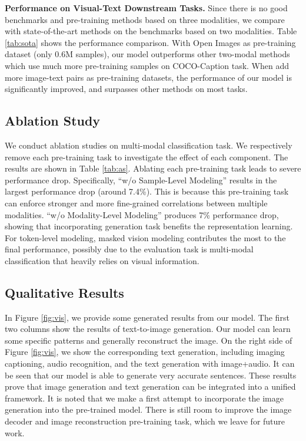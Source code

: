 \documentclass[10pt,twocolumn,letterpaper]{article}
\begin{document}
\textbf{Performance on Visual-Text Downstream Tasks.} Since there is no good benchmarks and pre-training methods based on three modalities, we compare with state-of-the-art methods on the benchmarks based on two modalities. Table \ref{tab:sota} shows the performance comparison. With Open Images as pre-training dataset (only 0.6M samples), our model outperforms other two-modal methods which use much more pre-training samples on COCO-Caption task. When add more image-text pairs as pre-training datasets, the performance of our model is significantly improved, and surpasses other methods on most tasks. 

\subsection{Ablation Study}
We conduct ablation studies on multi-modal classification task. We respectively remove each pre-training task to investigate the effect of each component. The results are shown in Table \ref{tab:as}. Ablating each pre-training task leads to severe performance drop. Specifically, ``w/o Sample-Level Modeling'' results in the largest performance drop (around 7.4\%). This is because this pre-training task can enforce stronger and more fine-grained correlations between multiple modalities. ``w/o Modality-Level Modeling'' produces 7\% performance drop, showing that incorporating generation task benefits the representation learning. For token-level modeling, masked vision modeling contributes the most to the final performance, possibly due to the evaluation task is multi-modal classification that heavily relies on visual information. 

\subsection{Qualitative Results}
In Figure \ref{fig:vis}, we provide some generated results from our model. The first two columns show the results of text-to-image generation. Our model can learn some specific patterns and generally reconstruct the image. On the right side of Figure \ref{fig:vis}, we show the corresponding text generation, including imaging captioning, audio recognition, and the text generation with image+audio. It can be seen that our model is able to generate very accurate sentences. These results prove that image generation and text generation can be integrated into a unified framework. It is noted that we make a first attempt to incorporate the image generation into the pre-trained model. There is still room to improve the image decoder and image reconstruction pre-training task, which we leave for future work.
\end{document}
